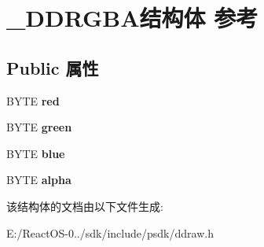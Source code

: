 \hypertarget{struct___d_d_r_g_b_a}{}\section{\+\_\+\+D\+D\+R\+G\+B\+A结构体 参考}
\label{struct___d_d_r_g_b_a}
\subsection*{Public 属性}
\begin{DoxyCompactItemize}
\item 
\mbox{\label{struct___d_d_r_g_b_a_ad263f8548d17955fcfff20588b41a607}} 
B\+Y\+TE {\bfseries red}
\item 
\mbox{\label{struct___d_d_r_g_b_a_aa46250f2df943203d1d249bb5861b6e4}} 
B\+Y\+TE {\bfseries green}
\item 
\mbox{\label{struct___d_d_r_g_b_a_a2ee91023c08131f79eebb63d718b2d68}} 
B\+Y\+TE {\bfseries blue}
\item 
\mbox{\label{struct___d_d_r_g_b_a_a40ecf049e50894db4550db7bf96248a9}} 
B\+Y\+TE {\bfseries alpha}
\end{DoxyCompactItemize}


该结构体的文档由以下文件生成\+:\begin{DoxyCompactItemize}
\item 
E\+:/\+React\+O\+S-\/0../sdk/include/psdk/ddraw.\+h\end{DoxyCompactItemize}
